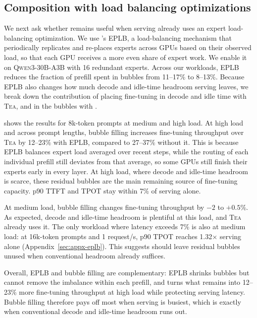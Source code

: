 \subsection{Composition with load balancing optimizations}
\label{sec:eval-eplb}

We next ask whether \sys remains useful when serving already uses an expert load-balancing optimization.
We use \vllm's \ac{EPLB}, a load-balancing  mechanism that periodically replicates and re-places experts across GPUs based on their observed load, so that each GPU receives a more even share of expert work.
We enable it on \textsc{Qwen3-30B-A3B} with 16 redundant experts.
Across our workloads, \ac{EPLB} reduces the fraction of prefill spent in bubbles from 11--17\% to 8--13\%.
Because \ac{EPLB} also changes how much decode and idle-time headroom serving leaves, we break down the contribution of placing fine-tuning in decode and idle time with \textsc{Tea}, and in the bubbles with \sys.

 shows the results for 8k-token prompts at medium and high load.
At high load and across prompt lengths, bubble filling increases fine-tuning throughput over \textsc{Tea} by 12--23\% with \ac{EPLB}, compared to 27--37\% without it.
This is because \ac{EPLB} balances expert load averaged over recent steps, while the routing of each individual prefill still deviates from that average, so some GPUs still finish their experts early in every layer.
At high load, where decode and idle-time headroom is scarce, these residual bubbles are the main remaining source of fine-tuning capacity.
p90 \ac{TTFT} and \ac{TPOT} stay within 7\% of serving alone.

At medium load, bubble filling changes fine-tuning throughput by $-2$ to $+0.5$\%.
As expected, decode and idle-time headroom is plentiful at this load, and \textsc{Tea} already uses it.
The only workload where latency exceeds 7\% is also at medium load: at 16k-token prompts and 1 request/s, p90 \ac{TPOT} reaches 1.32$\times$ serving alone (Appendix~\ref{sec:appx-eplb}).
This suggests \sys should leave residual bubbles unused when conventional headroom already suffices.

Overall, \ac{EPLB} and bubble filling are complementary: \ac{EPLB} shrinks bubbles but cannot remove the imbalance within each prefill, and \sys turns what remains into 12--23\% more fine-tuning throughput at high load while protecting serving latency.
Bubble filling therefore pays off most when serving is busiest, which is exactly when conventional decode and idle-time headroom runs out.
